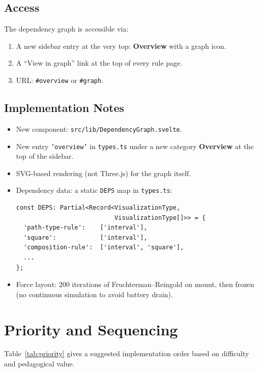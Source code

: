 \documentclass[11pt,a4paper]{article}
\begin{document}
\subsection{Access}

The dependency graph is accessible via:
\begin{enumerate}
  \item A new sidebar entry at the very top: \textbf{Overview} with a graph icon.
  \item A ``View in graph'' link at the top of every rule page.
  \item URL: \texttt{\#overview} or \texttt{\#graph}.
\end{enumerate}

\subsection{Implementation Notes}

\begin{itemize}
  \item New component: \texttt{src/lib/DependencyGraph.svelte}.
  \item New entry \texttt{'overview'} in \texttt{types.ts} under a new category
    \textbf{Overview} at the top of the sidebar.
  \item SVG-based rendering (not Three.js) for the graph itself.
  \item Dependency data: a static \texttt{DEPS} map in \texttt{types.ts}:
\begin{verbatim}
const DEPS: Partial<Record<VisualizationType,
                           VisualizationType[]>> = {
  'path-type-rule':    ['interval'],
  'square':            ['interval'],
  'composition-rule':  ['interval', 'square'],
  ...
};
\end{verbatim}
  \item Force layout: 200 iterations of Fruchterman–Reingold on mount,
    then frozen (no continuous simulation to avoid battery drain).
\end{itemize}

\section{Priority and Sequencing}

Table~\ref{tab:priority} gives a suggested implementation order based on
difficulty and pedagogical value.
\end{document}
